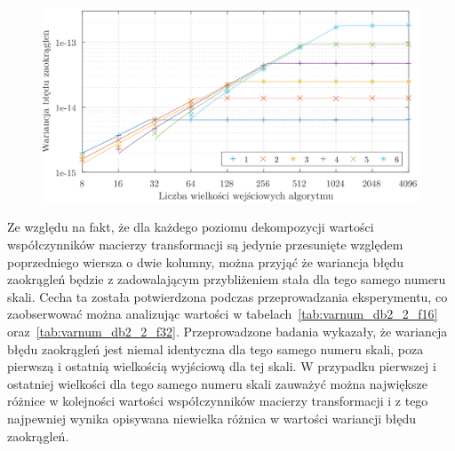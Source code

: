 \begin{figure}[htb!]
\begin{center}
\includegraphics{obrazki/dwt_rerror_coif5}
\end{center}
\end{figure}

Ze względu na fakt, że dla każdego poziomu dekompozycji wartości współczynników macierzy transformacji są jedynie przesunięte względem poprzedniego wiersza o dwie kolumny, można przyjąć że wariancja błędu zaokrągleń będzie z zadowalającym przybliżeniem stała dla tego samego numeru skali. Cecha ta została potwierdzona podczas przeprowadzania eksperymentu, co zaobserwować można analizując wartości w tabelach~\ref{tab:varnum_db2_2_f16} oraz~\ref{tab:varnum_db2_2_f32}. Przeprowadzone badania wykazały, że wariancja błędu zaokrągleń jest niemal identyczna dla tego samego numeru skali, poza pierwszą i ostatnią wielkością wyjściową dla tej skali. W przypadku pierwszej i ostatniej wielkości dla tego samego numeru skali zauważyć można największe różnice w kolejności wartości współczynników macierzy transformacji i z tego najpewniej wynika opisywana niewielka różnica w wartości wariancji błędu zaokrągleń.

